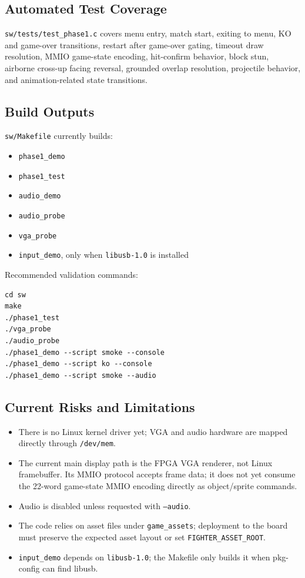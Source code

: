 \documentclass[12pt,a4paper]{article}
\begin{document}
\subsection{Automated Test Coverage}

\texttt{sw/tests/test\_phase1.c} covers menu entry, match start, exiting to
menu, KO and game-over transitions, restart after game-over gating, timeout
draw resolution, MMIO game-state encoding, hit-confirm behavior, block stun,
airborne cross-up facing reversal, grounded overlap resolution, projectile
behavior, and animation-related state transitions.

\subsection{Build Outputs}

\texttt{sw/Makefile} currently builds:

\begin{itemize}
  \item \texttt{phase1\_demo}
  \item \texttt{phase1\_test}
  \item \texttt{audio\_demo}
  \item \texttt{audio\_probe}
  \item \texttt{vga\_probe}
  \item \texttt{input\_demo}, only when \texttt{libusb-1.0} is installed
\end{itemize}

Recommended validation commands:

\begin{lstlisting}[style=fighterstyle]
cd sw
make
./phase1_test
./vga_probe
./audio_probe
./phase1_demo --script smoke --console
./phase1_demo --script ko --console
./phase1_demo --script smoke --audio
\end{lstlisting}

\subsection{Current Risks and Limitations}

\begin{itemize}
  \item There is no Linux kernel driver yet; VGA and audio hardware are mapped
  directly through \texttt{/dev/mem}.
  \item The current main display path is the FPGA VGA renderer, not Linux
  framebuffer. Its MMIO protocol accepts frame data; it does not yet consume
  the 22-word game-state MMIO encoding directly as object/sprite commands.
  \item Audio is disabled unless requested with \texttt{--audio}.
  \item The code relies on asset files under \texttt{game\_assets}; deployment
  to the board must preserve the expected asset layout or set
  \texttt{FIGHTER\_ASSET\_ROOT}.
  \item \texttt{input\_demo} depends on \texttt{libusb-1.0}; the Makefile only
  builds it when pkg-config can find libusb.
\end{itemize}
\end{document}
